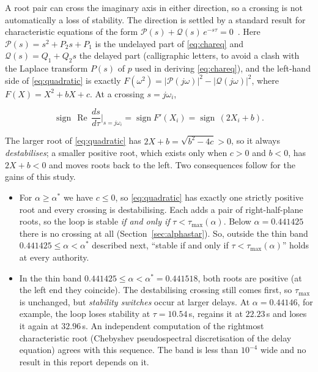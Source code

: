 \documentclass[11pt,a4paper]{article}
\newcommand{\astar}{\alpha^{*}}
\theoremstyle{plain}
\theoremstyle{definition}
\begin{document}
A root pair can cross the imaginary axis in either direction, so a
crossing is not automatically a loss of stability. The direction is
settled by a standard result for characteristic equations of the form
$\mathcal{P}(s) + \mathcal{Q}(s)\,e^{-s\tau} = 0$~\cite{cooke1986zeroes}.
Here $\mathcal{P}(s) = s^2 + P_2 s + P_1$ is the undelayed part of
\eqref{eq:chareq} and $\mathcal{Q}(s) = Q_1 + Q_2 s$ the delayed part
(calligraphic letters, to avoid a clash with the Laplace transform
$P(s)$ of $p$ used in deriving \eqref{eq:chareq}), and the left-hand side of \eqref{eq:quadratic} is exactly
$F(\omega^2) = |\mathcal{P}(j\omega)|^2 - |\mathcal{Q}(j\omega)|^2$,
where $F(X) = X^2 + bX + c$. At a crossing $s = j\omega_i$,

\begin{equation}
\operatorname{sign}\,\operatorname{Re}\,\frac{ds}{d\tau}\bigg|_{s = j\omega_i}
= \operatorname{sign} F'(X_i)
= \operatorname{sign}\,(2X_i + b).
\label{eq:direction}
\end{equation}

The larger root of \eqref{eq:quadratic} has $2X + b = \sqrt{b^2 - 4c} > 0$,
so it always \emph{destabilises}; a smaller positive root, which exists
only when $c > 0$ and $b < 0$, has $2X + b < 0$ and moves roots back to
the left. Two consequences follow for the gains of this study.

\begin{itemize}
\item For $\alpha \ge \astar$ we have $c \le 0$, so
      \eqref{eq:quadratic} has exactly one strictly positive root and
      every crossing is destabilising. Each adds a pair of right-half-plane
      roots, so the loop is stable \emph{if and only if}
      $\tau < \tau_{\max}(\alpha)$. Below $\alpha = 0.441425$ there is no
      crossing at all (Section~\ref{sec:alphastar}). So, outside the thin
      band $0.441425 \le \alpha < \astar$ described next, ``stable if
      and only if $\tau < \tau_{\max}(\alpha)$'' holds at every
      authority.
\item In the thin band $0.441425 \le \alpha < \astar = 0.441518$, both
      roots are positive (at the left end they coincide). The destabilising crossing still comes first,
      so $\tau_{\max}$ is unchanged, but \emph{stability switches} occur
      at larger delays. At $\alpha = 0.44146$, for example, the loop
      loses stability at $\tau = 10.54$\,s, regains it at $22.23$\,s and
      loses it again at $32.96$\,s. An independent computation of the
      rightmost characteristic root (Chebyshev pseudospectral
      discretisation of the delay equation) agrees with this sequence.
      The band is less than $10^{-4}$ wide and no result in this report
      depends on it.
\end{itemize}
\end{document}
